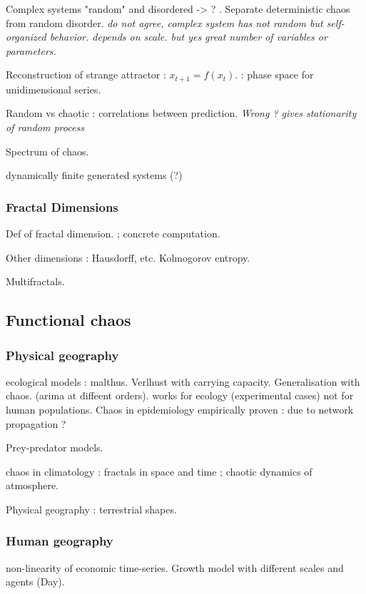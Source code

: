 Complex systems "random" and disordered -> ? . Separate deterministic chaos from random disorder. \textit{do not agree, complex system has not random but self-organized behavior. depends on scale. but yes great number of variables or parameters.}

Reconstruction of strange attractor : $x_{t+1} = f(x_{t})$. : phase space for unidimensional series. 

Random vs chaotic :  correlations between prediction. \textit{Wrong ? gives stationarity of random process}

Spectrum of chaos. 

dynamically finite generated systems (?)

\subsubsection{Fractal Dimensions}

Def of fractal dimension. ; concrete computation.

Other dimensions : Hausdorff, etc. Kolmogorov entropy.

Multifractals.

\subsection{Functional chaos}

\subsubsection{Physical geography}

ecological models : malthus. Verlhust with carrying capacity. Generalisation with chaos. (arima at diffeent orders). works for ecology (experimental cases) not for human populations. Chaos in epidemiology empirically proven : due to network propagation ?

Prey-predator models.

chaos in climatology : fractals in space and time ; chaotic dynamics of atmosphere.

Physical geography : terrestrial shapes.

\subsubsection{Human geography}

non-linearity of economic time-series. Growth model with different scales and agents (Day).

